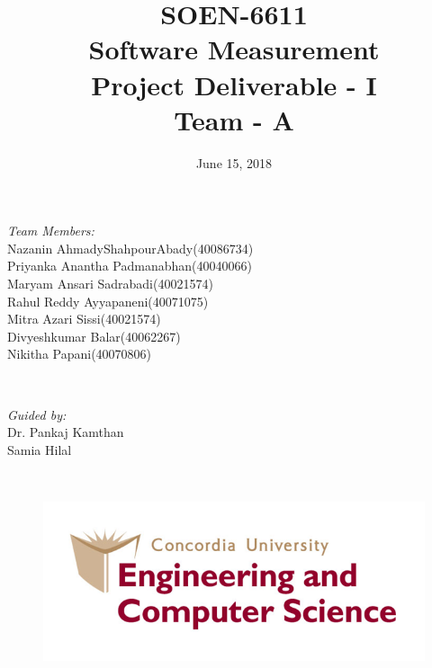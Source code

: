 \documentclass[a4paper, 11pt]{article}
\begin{document}
  
\title{SOEN-6611\\ Software Measurement\\ Project Deliverable - I\\ Team - A}

\date{}
\maketitle
\noindent
\begin{minipage}[H]{0.7\textwidth}
\begin{flushleft} \large
\emph{Team Members:}\\
 Nazanin AhmadyShahpourAbady(40086734)
 \\
 Priyanka Anantha Padmanabhan(40040066)
 \\
 Maryam Ansari Sadrabadi(40021574)
 \\
 Rahul Reddy Ayyapaneni(40071075)
 \\
 Mitra Azari Sissi(40021574)
 \\
 Divyeshkumar Balar(40062267)
 \\
 Nikitha Papani(40070806)
 
\end{flushleft}
\end{minipage}
~
\begin{minipage}{0.3\textwidth}
\begin{flushright} \large
\emph{Guided by:} \\
Dr. Pankaj Kamthan
\\
Samia Hilal %
\end{flushright}
\end{minipage}\\[2cm]

\begin{center}
	\date{\LARGE June 15, 2018}
\end{center}

\begin{figure}[H]
	\includegraphics[scale=1]{concordia_logo.png}
	\vspace{1cm}
\end{figure}
\end{document}
